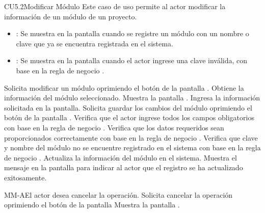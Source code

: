 \begin{UseCase}{CU5.2}{Modificar Módulo}{
		Este caso de uso permite al actor modificar la información de un módulo de un proyecto.
	}
{\begin{itemize}
		\item {}: Se muestra en la pantalla  cuando se registre un módulo con un nombre o clave que ya se encuentra registrada en el sistema.
		\item {}: Se muestra en la pantalla  cuando el actor ingrese una clave inválida, con base en la regla de negocio .
		\end{itemize}
		}
	\end{UseCase}
	\begin{UCtrayectoria}
		\UCpaso[\UCactor] Solicita modificar un módulo oprimiendo el botón \editar de la pantalla .
		\UCpaso[\UCsist] Obtiene la información del módulo seleccionado.
		\UCpaso[\UCsist] Muestra la pantalla .
		\UCpaso[\UCactor] Ingresa la información solicitada en la pantalla. \label{CU5.2-P4}
		\UCpaso[\UCactor] Solicita guardar los cambios del módulo oprimiendo el botón  de la pantalla . 
		\UCpaso[\UCsist] Verifica que el actor ingrese todos los campos obligatorios con base en la regla de negocio . 
		\UCpaso[\UCsist] Verifica que los datos requeridos sean proporcionados correctamente con base en la regla de negocio .  
		\UCpaso[\UCsist] Verifica que clave y nombre del módulo no se encuentre registrado en el sistema con base en la regla de negocio . 
		\UCpaso[\UCsist] Actualiza la información del módulo en el sistema.
		\UCpaso[\UCsist] Muestra el mensaje  en la pantalla  para indicar al actor que el registro se ha actualizado exitosamente.
	\end{UCtrayectoria}		
	
	\begin{UCtrayectoriaA}{MM-A}{El actor desea cancelar la operación.}
		\UCpaso[\UCactor] Solicita cancelar la operación oprimiendo el botón  de la pantalla 
		\UCpaso[\UCsist] Muestra la pantalla .
	\end{UCtrayectoriaA}

